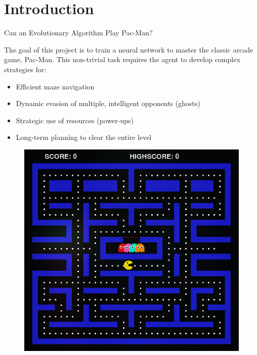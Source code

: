 \section{Introduction}

\begin{frame}{Can an Evolutionary Algorithm Play Pac-Man?}

	The goal of this project is to train a neural network to master the classic arcade game, Pac-Man.
	This non-trivial task requires the agent to develop complex strategies for:

	\begin{minipage}{0.55\textwidth}

		\vspace{0.5em}
		
		\begin{itemize}
			\item Efficient maze navigation
			\vspace{0.5em}
			\item Dynamic evasion of multiple, intelligent opponents (ghosts)
			\vspace{0.5em}
			\item Strategic use of resources (power-ups)
			\vspace{0.5em}
			\item Long-term planning to clear the entire level
		\end{itemize}
		
		\vspace{1em}
	\end{minipage}%
	\hfill
	\begin{minipage}{0.45\textwidth}
		\centering

		\vspace{-0.5em}

		\begin{figure}
			\centering
			\includegraphics[width=0.82\linewidth]{assets/maze.png} %


\end{figure}
\end{minipage}
\end{frame}
